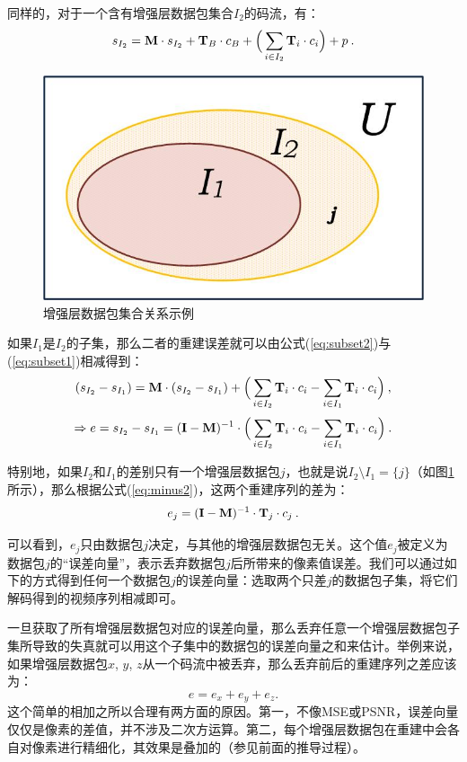 同样的，对于一个含有增强层数据包集合$I_2$的码流，有：
\begin{equation}
\label{eq:subset2}
s_{I_2} = {\rm\bf M} \cdot s_{I_2} + {\rm\bf T}_{B} \cdot c_{B} + \Big( \sum_{i \in I_2}{\rm\bf T}_i \cdot c_i \Big) + p \: .
\end{equation}

\begin{figure}[t]
	\centering
	\includegraphics[width = 0.5\linewidth]{figures/Subset.jpg}
	\caption{增强层数据包集合关系示例 \label{fig:subset}}
\end{figure}

如果$I_1$是$I_2$的子集，那么二者的重建误差就可以由公式(\ref{eq:subset2})与(\ref{eq:subset1})相减得到：
\begin{equation}
\label{eq:minus1}
(s_{I_2} - s_{I_1}) = {\rm\bf M} \cdot (s_{I_2} - s_{I_1}) + \Big( \sum_{i \in I_2}{\rm\bf T}_i \cdot c_i - \sum_{i \in I_1}{\rm\bf T}_i \cdot c_i \Big) \: ,
\end{equation}
\begin{equation}
\label{eq:minus2}
\Rightarrow e = s_{I_2} - s_{I_1} = ({\rm\bf I - M})^{-1} \cdot \Big( \sum_{i \in I_2}{\rm\bf T}_i \cdot c_i - \sum_{i \in I_1}{\rm\bf T}_i \cdot c_i \Big) \: .
\end{equation}

特别地，如果$I_2$和$I_1$的差别只有一个增强层数据包$j$，也就是说$I_2 \setminus I_1 = \{j\}$（如图\ref{fig:subset}所示），那么根据公式(\ref{eq:minus2})，这两个重建序列的差为：
\begin{equation}
\label{eq:error_j}
e_j = ({\rm\bf I - M})^{-1} \cdot {\rm\bf T}_j \cdot c_j \: .
\end{equation}

可以看到，$e_j$只由数据包$j$决定，与其他的增强层数据包无关。这个值$e_j$被定义为数据包$j$的“误差向量”，表示丢弃数据包$j$后所带来的像素值误差。我们可以通过如下的方式得到任何一个数据包$j$的误差向量：选取两个只差$j$的数据包子集，将它们解码得到的视频序列相减即可。

一旦获取了所有增强层数据包对应的误差向量，那么丢弃任意一个增强层数据包子集所导致的失真就可以用这个子集中的数据包的误差向量之和来估计。举例来说，如果增强层数据包$x$, $y$, $z$从一个码流中被丢弃，那么丢弃前后的重建序列之差应该为：
\begin{equation}
e = e_x + e_y + e_z.
\end{equation}
这个简单的相加之所以合理有两方面的原因。第一，不像MSE或PSNR，误差向量仅仅是像素的差值，并不涉及二次方运算。第二，每个增强层数据包在重建中会各自对像素进行精细化，其效果是叠加的（参见前面的推导过程）。

